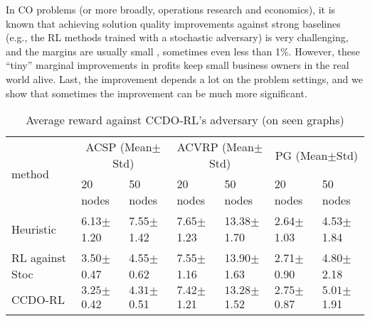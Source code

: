 \begin{remark}
    In CO problems (or more broadly, operations research and economics), it is known that achieving solution quality improvements against strong baselines (e.g., the RL methods trained with a stochastic adversary) is very challenging, and the margins are usually small \citep{kool2018attention}, sometimes even less than 1\%. However, these “tiny” marginal improvements in profits keep small business owners in the real world alive. Last, the improvement depends a lot on the problem settings, and we show that sometimes the improvement can be much more significant.
\end{remark}
\vspace{-\baselineskip}

\begin{table}[ht]
  \caption{Average reward against CCDO-RL's adversary (on seen graphs)}
  \vspace{\baselineskip}
  \label{tab_aver}
  \centering
  \small
  \begin{tabular}{lllllll}
    \toprule
    \multirow{2}{*}{method} & \multicolumn{2}{c}{ACSP (Mean$\pm$Std)} & \multicolumn{2}{c}{ACVRP (Mean$\pm$Std)} & \multicolumn{2}{c}{PG (Mean$\pm$Std)} \\
    \cmidrule(r){2-3} \cmidrule{4-5} \cmidrule(r){6-7}
                            & 20 nodes & 50 nodes & 20 nodes & 50 nodes & 20 nodes & 50 nodes\\
    \midrule
    Heuristic & 6.13$\pm$1.20 & 7.55$\pm$1.42 & 7.65$\pm$1.23  & 13.38$\pm$1.70 & 2.64$\pm$1.03 & 4.53$\pm$1.84   \\
    RL against Stoc    & 3.50$\pm$0.47  & 4.55$\pm$0.62  & 7.55$\pm$1.16  & 13.90$\pm$1.63 & 2.71$\pm$0.90 & 4.80$\pm$2.18   \\
    CCDO-RL   & $\pmb{3.25}$$\pm$0.42 & $\pmb{4.31}$$\pm$0.51  & $\pmb{7.42}$$\pm$1.21  & $\pmb{13.28}$$\pm$1.52 &  $\pmb{2.75}$$\pm$0.87 & $\pmb{5.01}$$\pm$1.91  \\
    \bottomrule
  \end{tabular}
\end{table}
\vspace{-\baselineskip}

